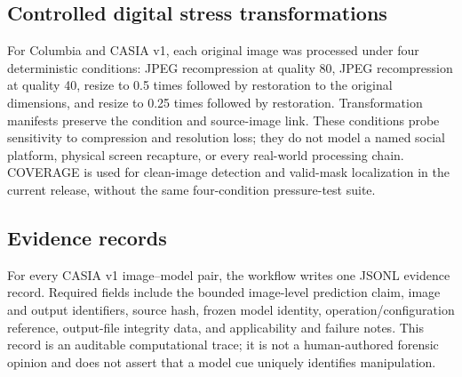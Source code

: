 \subsection{Controlled digital stress transformations}
For Columbia and CASIA v1, each original image was processed under four deterministic conditions: JPEG recompression at quality 80, JPEG recompression at quality 40, resize to 0.5 times followed by restoration to the original dimensions, and resize to 0.25 times followed by restoration. Transformation manifests preserve the condition and source-image link. These conditions probe sensitivity to compression and resolution loss; they do not model a named social platform, physical screen recapture, or every real-world processing chain. COVERAGE is used for clean-image detection and valid-mask localization in the current release, without the same four-condition pressure-test suite.

\subsection{Evidence records}
For every CASIA v1 image--model pair, the workflow writes one JSONL evidence record. Required fields include the bounded image-level prediction claim, image and output identifiers, source hash, frozen model identity, operation/configuration reference, output-file integrity data, and applicability and failure notes. This record is an auditable computational trace; it is not a human-authored forensic opinion and does not assert that a model cue uniquely identifies manipulation.
